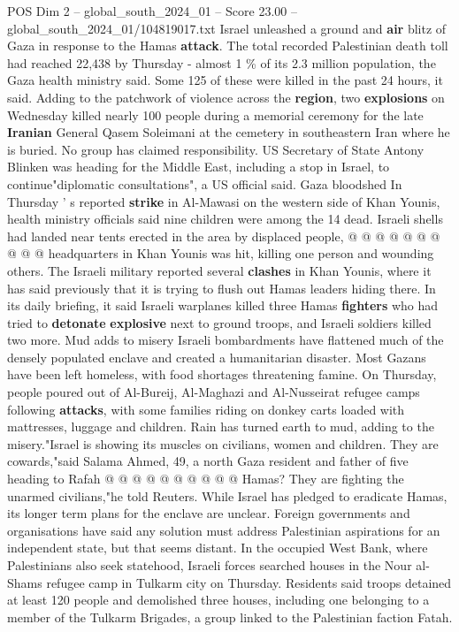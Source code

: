 \begin{textsample}{POS Dim 2 – global\_south\_2024\_01 – Score 23.00 – global\_south\_2024\_01/104819017.txt}
Israel unleashed a ground and \textbf{air} blitz of Gaza in response to the Hamas \textbf{attack}.
The total recorded Palestinian death toll had reached 22,438 by Thursday - almost 1 \% of its 2.3 million population, the Gaza health ministry said.
Some 125 of these were killed in the past 24 hours, it said.
Adding to the patchwork of violence across the \textbf{region}, two \textbf{explosions} on Wednesday killed nearly 100 people during a memorial ceremony for the late \textbf{Iranian} General Qasem Soleimani at the cemetery in southeastern Iran where he is buried.
No group has claimed responsibility.
US Secretary of State Antony Blinken was heading for the Middle East, including a stop in Israel, to continue"diplomatic consultations", a US official said.
Gaza bloodshed In Thursday ' s reported \textbf{strike} in Al-Mawasi on the western side of Khan Younis, health ministry officials said nine children were among the 14 dead.
Israeli shells had landed near tents erected in the area by displaced people, @ @ @ @ @ @ @ @ @ @ headquarters in Khan Younis was hit, killing one person and wounding others.
The Israeli military reported several \textbf{clashes} in Khan Younis, where it has said previously that it is trying to flush out Hamas leaders hiding there.
In its daily briefing, it said Israeli warplanes killed three Hamas \textbf{fighters} who had tried to \textbf{detonate} \textbf{explosive} next to ground troops, and Israeli soldiers killed two more.
Mud adds to misery Israeli bombardments have flattened much of the densely populated enclave and created a humanitarian disaster.
Most Gazans have been left homeless, with food shortages threatening famine.
On Thursday, people poured out of Al-Bureij, Al-Maghazi and Al-Nusseirat refugee camps following \textbf{attacks}, with some families riding on donkey carts loaded with mattresses, luggage and children.
Rain has turned earth to mud, adding to the misery."Israel is showing its muscles on civilians, women and children.
They are cowards,"said Salama Ahmed, 49, a north Gaza resident and father of five heading to Rafah @ @ @ @ @ @ @ @ @ @ Hamas?
They are fighting the unarmed civilians,"he told Reuters.
While Israel has pledged to eradicate Hamas, its longer term plans for the enclave are unclear.
Foreign governments and organisations have said any solution must address Palestinian aspirations for an independent state, but that seems distant.
In the occupied West Bank, where Palestinians also seek statehood, Israeli forces searched houses in the Nour al-Shams refugee camp in Tulkarm city on Thursday.
Residents said troops detained at least 120 people and demolished three houses, including one belonging to a member of the Tulkarm Brigades, a group linked to the Palestinian faction Fatah.

\end{textsample}
